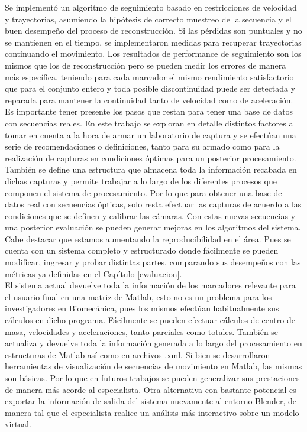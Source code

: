 Se implementó un algoritmo de seguimiento basado en restricciones de velocidad y trayectorias, asumiendo la hipótesis de correcto muestreo de la secuencia y el buen desempeño del proceso de reconstrucción. Si las pérdidas son puntuales y no se mantienen en el tiempo, se implementaron medidas para recuperar trayectorias continuando el movimiento. Los resultados de performance de seguimiento son los mismos que los de reconstrucción pero se pueden medir los errores de manera más específica, teniendo para cada marcador el mismo rendimiento satisfactorio que para el conjunto entero y toda posible discontinuidad puede ser detectada y reparada para mantener la continuidad tanto de velocidad como de aceleración. 
\\ 


Es importante tener presente los pasos que restan para tener una base de datos con secuencias reales.
En este trabajo se exploran en detalle distintos factores a tomar en cuenta  a la hora de armar un laboratorio de captura y se efectúan una serie de recomendaciones o definiciones, tanto para su armado como para la realización de capturas en condiciones óptimas para un posterior procesamiento. También se define una estructura que almacena toda la información recabada en dichas capturas y permite trabajar a lo largo de los diferentes procesos que componen el sistema de procesamiento. Por lo que para obtener una base de datos real con secuencias ópticas, solo resta efectuar las capturas de acuerdo a las condiciones que se definen y calibrar las cámaras. 
Con estas nuevas secuencias y una posterior evaluación se pueden generar mejoras en los algoritmos del sistema.\\


Cabe destacar que estamos aumentando la reproducibilidad en el área. Pues se cuenta con un sistema completo y estructurado donde fácilmente se pueden modificar, ingresar y probar distintas partes, comparando sus desempeños con las métricas ya definidas en el Capítulo \ref{evaluacion}.\\ 



El sistema actual devuelve toda la información de los marcadores relevante para el usuario final en una matriz de Matlab, esto no es un problema para los investigadores en Biomecánica, pues los mismos efectúan habitualmente sus cálculos en dicho programa. Fácilmente se pueden efectuar cálculos de centro de masa, velocidades y aceleraciones, tanto parciales como totales.
También se actualiza y devuelve toda la información generada a lo largo del procesamiento en estructuras de Matlab así como en archivos .xml. Si bien se desarrollaron herramientas de visualización de secuencias de movimiento en Matlab, las mismas son básicas. Por lo que en futuros trabajos se pueden generalizar sus prestaciones de manera más acorde al especialista. Otra alternativa con bastante potencial es exportar la información de salida del sistema nuevamente al entorno Blender, de manera tal que el especialista realice un análisis más interactivo sobre un modelo virtual.\\ 



